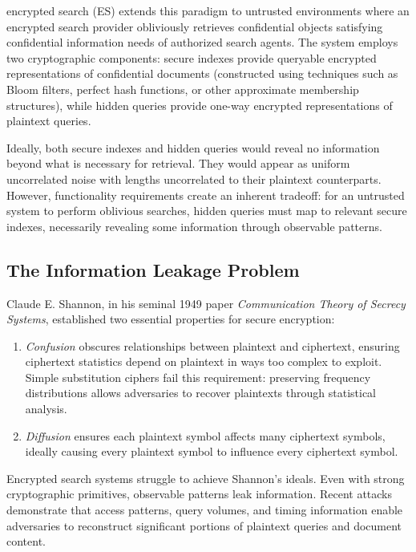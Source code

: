 \documentclass[final,11pt]{article}
\numberwithin{equation}{section}
\theoremstyle{plain}
\theoremstyle{remark}
\begin{document}
encrypted search (ES) extends this paradigm to untrusted environments where an encrypted search provider obliviously retrieves confidential objects satisfying confidential information needs of authorized search agents. The system employs two cryptographic components: secure indexes provide queryable encrypted representations of confidential documents (constructed using techniques such as Bloom filters, perfect hash functions, or other approximate membership structures), while hidden queries provide one-way encrypted representations of plaintext queries.

Ideally, both secure indexes and hidden queries would reveal no information beyond what is necessary for retrieval. They would appear as uniform uncorrelated noise with lengths uncorrelated to their plaintext counterparts. However, functionality requirements create an inherent tradeoff: for an untrusted system to perform oblivious searches, hidden queries must map to relevant secure indexes, necessarily revealing some information through observable patterns.

\subsection{The Information Leakage Problem}
Claude E. Shannon, in his seminal 1949 paper \emph{Communication Theory of Secrecy Systems}\cite{shannon1949communication}, established two essential properties for secure encryption:
\begin{enumerate}
    \item \emph{Confusion} obscures relationships between plaintext and ciphertext, ensuring ciphertext statistics depend on plaintext in ways too complex to exploit. Simple substitution ciphers fail this requirement: preserving frequency distributions allows adversaries to recover plaintexts through statistical analysis.
    \item \emph{Diffusion} ensures each plaintext symbol affects many ciphertext symbols, ideally causing every plaintext symbol to influence every ciphertext symbol.
\end{enumerate}

Encrypted search systems struggle to achieve Shannon's ideals. Even with strong cryptographic primitives, observable patterns leak information. Recent attacks demonstrate that access patterns\cite{islam2012access,cash2015leakage}, query volumes\cite{grubbs2017pump}, and timing information enable adversaries to reconstruct significant portions of plaintext queries and document content.
\end{document}
